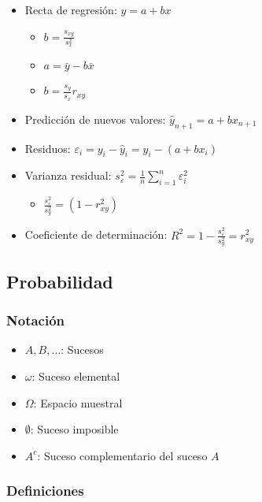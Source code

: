 \documentclass[
]{article}
\providecommand{\tightlist}{%
  \setlength{\itemsep}{0pt}\setlength{\parskip}{0pt}}
\begin{document}
\begin{itemize}
\item
  Recta de regresión: \(y=a+bx\)

  \begin{itemize}
  \tightlist
  \item
    \(b = \frac{s_{xy}}{s_x^2}\)
  \item
    \(a = \bar y - b \bar x\)
  \item
    \(b = \frac{s_y}{s_x}r_{xy}\)
  \end{itemize}
\item
  Predicción de nuevos valores: \(\hat{y}_{n+1} = a + bx_{n+1}\)
\item
  Residuos: \(\varepsilon_i=y_i - \hat{y}_i = y_i - (a+bx_i)\)
\item
  Varianza residual:
  \(s_\varepsilon^2= \frac{1}{n}\sum\limits_{i=1}^n \varepsilon_i^2\)

  \begin{itemize}
  \tightlist
  \item
    \(\frac{s_\varepsilon^2}{s_y^2}=(1-r_{xy}^2)\)
  \end{itemize}
\item
  Coeficiente de determinación:
  \(R^2 = 1- \frac{s_\varepsilon^2}{s_y^2} = r^2_{xy}\)
\end{itemize}

\hypertarget{probabilidad}{%
\subsection{Probabilidad}\label{probabilidad}}

\hypertarget{notaciuxf3n-2}{%
\subsubsection{Notación}\label{notaciuxf3n-2}}

\begin{itemize}
\tightlist
\item
  \(A, B, \ldots\): Sucesos
\item
  \(\omega\): Suceso elemental
\item
  \(\Omega\): Espacio muestral
\item
  \(\emptyset\): Suceso imposible
\item
  \(A^c\): Suceso complementario del suceso \(A\)
\end{itemize}

\hypertarget{definiciones}{%
\subsubsection{Definiciones}\label{definiciones}}
\end{document}
